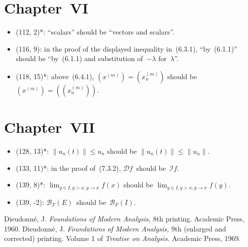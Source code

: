 \documentclass[letterpaper,12pt]{article}
\newcommand{\B}{\mathcal{B}}
\renewcommand{\Im}{\mathcal{I}}
\newcommand{\norm}[1]{\lVert{#1}\rVert}
\begin{document}
\section*{Chapter~VI}
\begin{itemize}
\item (112, 2)*: ``scalars'' should be ``vectors and scalars''.
\item (116, 9): in the proof of the displayed inequality in~(6.3.1), ``by~(6.1.1)'' should be ``by~(6.1.1) and substitution of~\(-\lambda\) for~\(\lambda\)''.
\item (118, 15)*: above~(6.4.1), \((x^{(m)})=(x^{(m)}_n)\) should be \((x^{(m)})=((x^{(m)}_n))\).
\end{itemize}

\section*{Chapter~VII}
\begin{itemize}
\item (128, 13)*: \(\norm{u_n(t)}\le u_n\) should be \(\norm{u_n(t)}\le\norm{u_n}\).
\item (133, 11)*: in the proof of~(7.3.2), \(\mathcal{D}f\)~should be~\(\Im f\).
\item (139, 8)*: \(\lim_{y\in I,y>x,y\to x}f(x)\) should be \(\lim_{y\in I,y>x,y\to x}f(y)\).
\item (139, -2): \(\B_F(E)\)~should be~\(\B_F(I)\).
\end{itemize}

\begin{thebibliography}{0}
 Dieudonn\'e, J. \textit{Foundations of Modern Analysis,} 8th printing. Academic Press, 1960.
 Dieudonn\'e, J. \textit{Foundations of Modern Analysis,} 9th (enlarged and corrected) printing. Volume 1 of \emph{Treatise on Analysis.} Academic Press, 1969.
\end{thebibliography}
\end{document}
